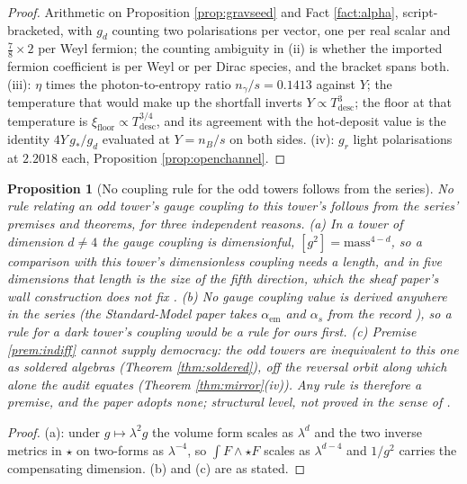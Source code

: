 \documentclass[11pt]{article}
\newtheorem{proposition}[theorem]{Proposition}
\theoremstyle{definition}
\begin{document}
\begin{proof}
Arithmetic on Proposition \ref{prop:gravseed} and Fact \ref{fact:alpha}, script-bracketed, with $g_{d}$ counting two polarisations per vector, one per real scalar and $\tfrac{7}{8} \times 2$ per Weyl fermion; the counting ambiguity in (ii) is whether the imported fermion coefficient is per Weyl or per Dirac species, and the bracket spans both. (iii): $\eta$ times the photon-to-entropy ratio $n_{\gamma}/s = 0.1413$ against $Y$; the temperature that would make up the shortfall inverts $Y \propto T_{\mathrm{desc}}^{3}$; the floor at that temperature is $\xi_{\mathrm{floor}} \propto T_{\mathrm{desc}}^{3/4}$, and its agreement with the hot-deposit value is the identity $4Y\,g_{*}/g_{d}$ evaluated at $Y = n_{B}/s$ on both sides. (iv): $g_{r}$ light polarisations at $2.2018$ each, Proposition \ref{prop:openchannel}.
\end{proof}

\begin{proposition}[No coupling rule for the odd towers follows from the series]\label{prop:norule}
No rule relating an odd tower's gauge coupling to this tower's follows from the series' premises and theorems, for three independent reasons. (a) In a tower of dimension $d \neq 4$ the gauge coupling is dimensionful, $[g^{2}] = \mathrm{mass}^{4-d}$, so a comparison with this tower's dimensionless coupling needs a length, and in five dimensions that length is the size of the fifth direction, which the sheaf paper's wall construction does not fix \cite{ButlerT4}. (b) No gauge coupling value is derived anywhere in the series (the Standard-Model paper takes $\alpha_{\mathrm{em}}$ and $\alpha_{s}$ from the record \cite[Fact 2.8, Prop.~6.1]{ButlerT12}), so a rule for a dark tower's coupling would be a rule for ours first. (c) Premise \ref{prem:indiff} cannot supply democracy: the odd towers are inequivalent to this one as soldered algebras (Theorem \ref{thm:soldered}), off the reversal orbit along which alone the audit equates (Theorem \ref{thm:mirror}(iv)). Any rule is therefore a premise, and the paper adopts none; structural level, not proved in the sense of \cite{ButlerT1}.
\end{proposition}

\begin{proof}
(a): under $g \mapsto \lambda^{2}g$ the volume form scales as $\lambda^{d}$ and the two inverse metrics in $\star$ on two-forms as $\lambda^{-4}$, so $\int F \wedge \star F$ scales as $\lambda^{d-4}$ and $1/g^{2}$ carries the compensating dimension. (b) and (c) are as stated.
\end{proof}
\end{document}
